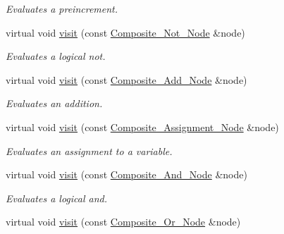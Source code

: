 \begin{DoxyCompactItemize}
\begin{DoxyCompactList}\small\item\em Evaluates a preincrement. \item\end{DoxyCompactList}\item 
virtual void \hyperlink{classMadara_1_1Expression__Tree_1_1Evaluation__Visitor_a2f6321d6bb771a915b3bd2bc05643f26}{visit} (const \hyperlink{classMadara_1_1Expression__Tree_1_1Composite__Not__Node}{Composite\_\-Not\_\-Node} \&node)
\begin{DoxyCompactList}\small\item\em Evaluates a logical not. \item\end{DoxyCompactList}\item 
virtual void \hyperlink{classMadara_1_1Expression__Tree_1_1Evaluation__Visitor_adc7d691a271e65c2cf1f2b40e2453f58}{visit} (const \hyperlink{classMadara_1_1Expression__Tree_1_1Composite__Add__Node}{Composite\_\-Add\_\-Node} \&node)
\begin{DoxyCompactList}\small\item\em Evaluates an addition. \item\end{DoxyCompactList}\item 
virtual void \hyperlink{classMadara_1_1Expression__Tree_1_1Evaluation__Visitor_a96b9cc06685677d61f60ef24dd301904}{visit} (const \hyperlink{classMadara_1_1Expression__Tree_1_1Composite__Assignment__Node}{Composite\_\-Assignment\_\-Node} \&node)
\begin{DoxyCompactList}\small\item\em Evaluates an assignment to a variable. \item\end{DoxyCompactList}\item 
virtual void \hyperlink{classMadara_1_1Expression__Tree_1_1Evaluation__Visitor_a2d685f97e2b81a556b665abb4da3dd21}{visit} (const \hyperlink{classMadara_1_1Expression__Tree_1_1Composite__And__Node}{Composite\_\-And\_\-Node} \&node)
\begin{DoxyCompactList}\small\item\em Evaluates a logical and. \item\end{DoxyCompactList}\item 
virtual void \hyperlink{classMadara_1_1Expression__Tree_1_1Evaluation__Visitor_af2fc2f3460afb55d7f543be3ebd49d45}{visit} (const \hyperlink{classMadara_1_1Expression__Tree_1_1Composite__Or__Node}{Composite\_\-Or\_\-Node} \&node)

\end{DoxyCompactItemize}
